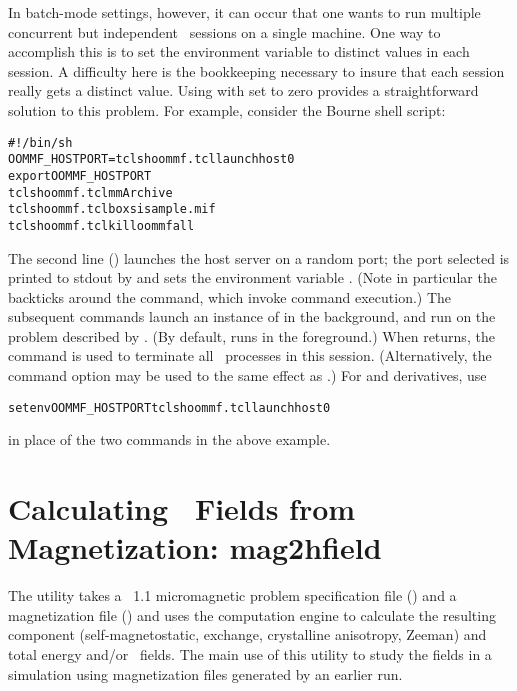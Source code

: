 In batch-mode settings, however, it can occur that one wants to run
multiple concurrent but independent \OOMMF\ sessions on a single
machine.  One way to accomplish this is to set the environment
variable  to distinct values in each session.
A difficulty here is the bookkeeping necessary to insure that each
session really gets a distinct value.  Using  with
 set to zero provides a straightforward solution to this
problem.  For example, consider the Bourne shell script:
\begin{alltt}
   #!/bin/sh
   OOMMF_HOSTPORT=\backtick{}tclsh oommf.tcl launchhost 0\backtick
   export OOMMF_HOSTPORT
   tclsh oommf.tcl mmArchive
   tclsh oommf.tcl boxsi sample.mif
   tclsh oommf.tcl killoommf all
\end{alltt}\html{\\}
The second line () launches the host server
on a random port; the port selected is printed to stdout by
 and sets the environment variable
.  (Note in particular the backticks around the
 command, which invoke command execution.)  The
subsequent commands launch an instance of  in the
background, and run  on the problem described by
.  (By default,  runs in the foreground.)
When  returns, the  command is used to
terminate all \OOMMF\ processes in this session.  (Alternatively, the
 command option  may be used to the same effect
as .)  For  and derivatives, use
\begin{alltt}
   setenv OOMMF_HOSTPORT \backtick{}tclsh oommf.tcl launchhost 0\backtick
\end{alltt}\html{\\}
in place of the two  commands in the above
example.



\section{Calculating \vH\ Fields from Magnetization:
            mag2hfield}\label{sec:mag2hfield}%

The  utility takes a
\MIF~1.1 micromagnetic problem specification file
() and a
magnetization file () and uses the  computation engine to calculate the resulting
component (self-magnetostatic, exchange, crystalline anisotropy, Zeeman)
and total energy and/or \vH\ fields.  The main use of this utility to study
the fields in a simulation using magnetization files generated by an
earlier
 run.

